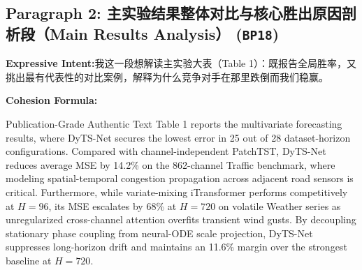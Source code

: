 \subsection*{Paragraph 2: 主实验结果整体对比与核心胜出原因剖析段（Main Results Analysis） (\texttt{BP18})}
\noindent\textbf{Expressive Intent:}\enspace 我这一段想解读主实验大表（Table 1）：既报告全局胜率，又挑出最有代表性的对比案例，解释为什么竞争对手在那里跌倒而我们稳赢。\par
\noindent\textbf{Cohesion Formula:}\par\vspace{4pt}
\begin{ExampleBox}{Publication-Grade Authentic Text}
Table 1 reports the multivariate forecasting results, where DyTS-Net secures the lowest error in 25 out of 28 dataset-horizon configurations. Compared with channel-independent PatchTST, DyTS-Net reduces average MSE by 14.2\% on the 862-channel Traffic benchmark, where modeling spatial-temporal congestion propagation across adjacent road sensors is critical. Furthermore, while variate-mixing iTransformer performs competitively at $H=96$, its MSE escalates by 68\% at $H=720$ on volatile Weather series as unregularized cross-channel attention overfits transient wind gusts. By decoupling stationary phase coupling from neural-ODE scale projection, DyTS-Net suppresses long-horizon drift and maintains an 11.6\% margin over the strongest baseline at $H=720$.
\end{ExampleBox}
